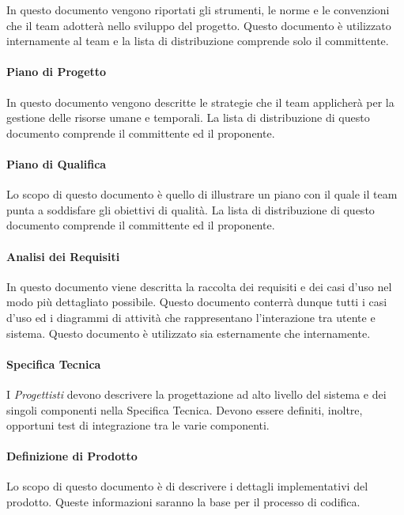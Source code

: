 In questo documento vengono riportati gli strumenti, le norme e le
convenzioni che il team adotterà nello sviluppo del progetto. Questo
documento è utilizzato internamente al team e la lista di
distribuzione comprende solo il committente. 

\paragraph{Piano di Progetto }

In questo documento vengono descritte le strategie che il team
applicherà per la gestione delle risorse umane e temporali. La lista
di distribuzione di questo documento comprende il committente ed il
proponente. 

\paragraph{Piano di Qualifica }

Lo scopo di questo documento è quello di illustrare un piano con il
quale  il team punta a soddisfare gli obiettivi di qualità.  La lista
di distribuzione di questo documento comprende il committente ed il
proponente. 

\paragraph{Analisi dei Requisiti }

In questo documento viene descritta la raccolta dei requisiti e dei
casi d'uso nel modo più dettagliato possibile. Questo documento
conterrà dunque tutti i casi d'uso ed
i diagrammi di attività che rappresentano l'interazione 
tra utente e sistema. Questo documento è utilizzato sia
esternamente che internamente. 


\paragraph{Specifica Tecnica }
I  \emph{Progettisti}  devono descrivere la progettazione ad alto livello del
sistema e dei singoli componenti nella Specifica Tecnica. Devono
essere definiti, inoltre, opportuni test di integrazione tra le varie
componenti.



\paragraph{Definizione di Prodotto  }
Lo scopo di questo documento è di descrivere i dettagli implementativi del prodotto.
Queste informazioni saranno la base per il processo di codifica.

